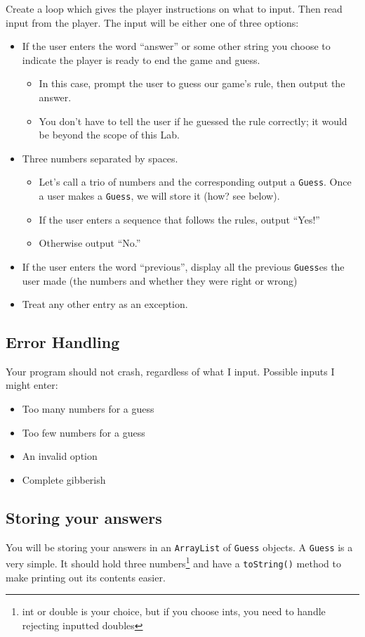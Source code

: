 \documentclass[10pt,letterpaper]{article}
\begin{document}
	Create a loop which gives the player instructions on what to input.
	Then read input from the player.
	The input will be either one of three options:
	\begin{itemize}
		\item If the user enters the word ``answer'' or some other string you choose to indicate the player is ready to end the game and guess.
		\begin{itemize}
			\item In this case, prompt the user to guess our game's rule, then output the answer.
			\item You don't have to tell the user if he guessed the rule correctly;  it would be beyond the scope of this Lab.
		\end{itemize}
		\item Three numbers separated by spaces.
		\begin{itemize}
			\item Let's call a trio of numbers and the corresponding output a \texttt{Guess}.  Once a user makes a \texttt{Guess}, we will store it (how?  see below).
			\item If the user enters a sequence that follows the rules, output ``Yes!''
			\item Otherwise output ``No.''
		\end{itemize}
		 \item  If the user enters the word ``previous'', display all the previous \texttt{Guess}es the user made (the numbers and whether they were right or wrong) 
		 \item  Treat any other entry as an exception.
	\end{itemize}
	
	
	
	
	\subsection{Error Handling}
	Your program should not crash, regardless of what I input.  
	Possible inputs I might enter:
	\begin{itemize}
		\item Too many numbers for a guess
		\item Too few numbers for a guess
		\item An invalid option
		\item Complete gibberish
	\end{itemize}
	
	
	\subsection{Storing your answers}
	You will be storing your answers in an \texttt{ArrayList} of \texttt{Guess} objects.
	A \texttt{Guess} is a very simple.  It should hold three numbers\footnote{int or double is your choice, but if you choose ints, you need to handle rejecting inputted doubles} and have a \texttt{toString()} method to make printing out its contents easier.
	
\end{document}
